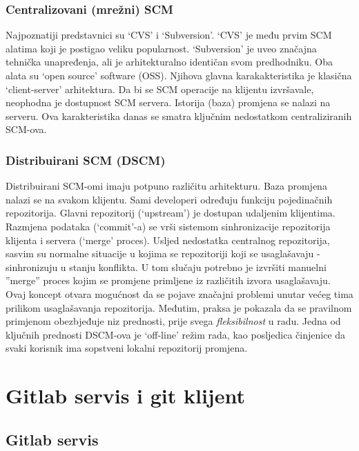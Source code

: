 \documentclass[times, utf8, seminar]{fit}
\begin{document}
\subsection{Centralizovani (mrežni) SCM}

Najpoznatiji predstavnici su `CVS' i `Subversion'. `CVS' je među prvim SCM alatima koji je postigao veliku popularnost. `Subversion' je uveo značajna tehnička unapređenja, ali je arhitekturalno identičan svom predhodniku. Oba alata su `open source' software (OSS). Njihova glavna karakakteristika je klasična `client-server' arhitektura. Da bi se SCM operacije na klijentu izvršavale, neophodna je dostupnost SCM servera. Istorija (baza) promjena se nalazi na serveru. Ova karakteristika danas se smatra ključnim nedostatkom centraliziranih SCM-ova.

\subsection{Distribuirani SCM (DSCM)}

Distribuirani SCM-omi imaju potpuno različitu arhitekturu. Baza promjena nalazi se na svakom klijentu.
Sami developeri određuju funkciju pojedinačnih repozitorija. Glavni repozitorij (`upstream') je dostupan udaljenim klijentima.
Razmjena podataka (`commit'-a) se vrši sistemom sinhronizacije repozitorija klijenta i servera (`merge' proces). 
Usljed nedostatka centralnog repozitorija, sasvim su normalne situacije u kojima se repozitoriji koji se usaglašavaju - sinhronizuju u stanju konflikta.
U tom slučaju potrebno je izvršiti manuelni ''merge'' proces kojim se promjene primljene iz različitih izvora usaglašavaju.
Ovaj koncept otvara mogućnost da se pojave značajni problemi unutar većeg tima prilikom usaglašavanja repozitorija. Međutim, praksa je pokazala da se pravilnom primjenom obezbjeđuje niz prednosti, prije svega \emph{fleksibilnost} u radu. Jedna od ključnih prednosti DSCM-ova je `off-line' režim rada, kao posljedica činjenice da svaki korisnik ima sopstveni lokalni repozitorij promjena.

\chapter{Gitlab servis i git klijent}
\vspace*{-0.7cm}

\section{Gitlab servis}
\end{document}
